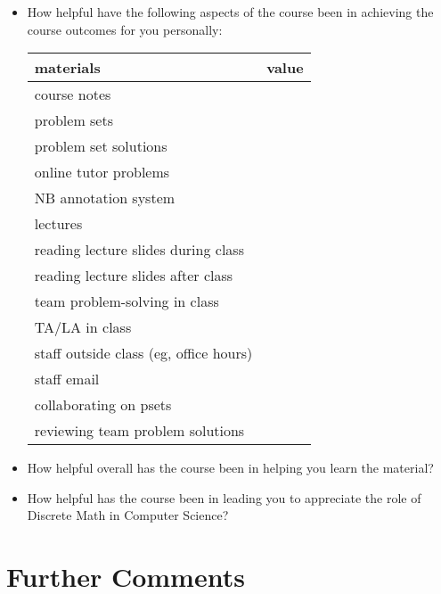 \documentclass[handout]{mcs}
\begin{document}
\begin{itemize}

\item How helpful have the following aspects of the course been in
achieving the course outcomes for you personally:
\begin{center}

\begin{tabular}{| l | c |}
materials & value\\
\hline  \hline
   course notes          & \hspace{0.7in}\\  \hline
   problem sets          & \\  \hline
   problem set solutions & \\  \hline
   online tutor problems & \\  \hline
   NB annotation system  & \\  \hline
   lectures              & \\  \hline
   reading lecture slides during class    & \\  \hline
   reading lecture slides after class     & \\  \hline
   team problem-solving in class          & \\  \hline
   TA/LA in class        & \\  \hline
   staff outside class (eg, office hours) & \\  \hline
   staff email           &\\ \hline
   collaborating on psets                 & \\  \hline
   reviewing team problem solutions       & \\  \hline
\end{tabular}
\end{center}

\item How helpful overall has the course been in helping you learn the
material?  \hfill \brule{0.5in}

\item How helpful has the course been in leading you to appreciate the role of
Discrete Math in Computer Science? \hfill \brule{0.5in}

\end{itemize}

\newpage
\section*{Further Comments}
\end{document}
